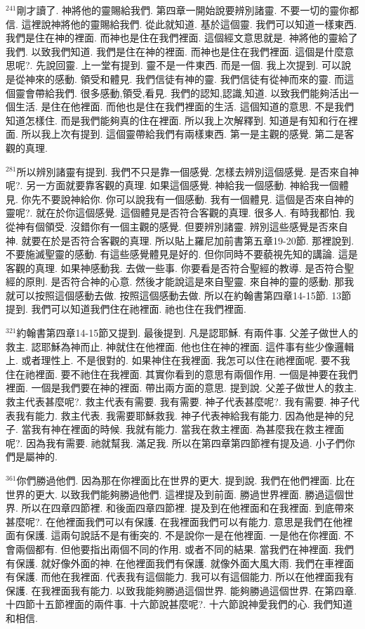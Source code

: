 \documentclass{book}
\begin{document}
$^{241}$剛才讀了.
神將他的靈賜給我們.
第四章一開始說要辨別諸靈.
不要一切的靈你都信.
這裡說神將他的靈賜給我們.
從此就知道.
基於這個靈.
我們可以知道一樣東西.
我們是住在神的裡面.
而神也是住在我們裡面.
這個經文意思就是.
神將他的靈給了我們.
以致我們知道.
我們是住在神的裡面.
而神也是住在我們裡面.
這個是什麼意思呢?.
先說回靈.
上一堂有提到.
靈不是一件東西.
而是一個.
我上次提到.
可以說是從神來的感動.
領受和體見.
我們信徒有神的靈.
我們信徒有從神而來的靈.
而這個靈會帶給我們.
很多感動,領受,看見.
我們的認知,認識,知道.
以致我們能夠活出一個生活.
是住在他裡面.
而他也是住在我們裡面的生活.
這個知道的意思.
不是我們知道怎樣住.
而是我們能夠真的住在裡面.
所以我上次解釋到.
知道是有知和行在裡面.
所以我上次有提到.
這個靈帶給我們有兩樣東西.
第一是主觀的感覺.
第二是客觀的真理.

$^{281}$所以辨別諸靈有提到.
我們不只是靠一個感覺.
怎樣去辨別這個感覺.
是否來自神呢?.
另一方面就要靠客觀的真理.
如果這個感覺.
神給我一個感動.
神給我一個體見.
你先不要說神給你.
你可以說我有一個感動.
我有一個體見.
這個是否來自神的靈呢?.
就在於你這個感覺.
這個體見是否符合客觀的真理.
很多人.
有時我都怕.
我從神有個領受.
沒錯你有一個主觀的感覺.
但要辨別諸靈.
辨別這些感覺是否來自神.
就要在於是否符合客觀的真理.
所以貼上羅尼加前書第五章19-20節.
那裡說到.
不要施滅聖靈的感動.
有這些感覺體見是好的.
但你同時不要藐視先知的講論.
這是客觀的真理.
如果神感動我.
去做一些事.
你要看是否符合聖經的教導.
是否符合聖經的原則.
是否符合神的心意.
然後才能說這是來自聖靈.
來自神的靈的感動.
那我就可以按照這個感動去做.
按照這個感動去做.
所以在約翰書第四章14-15節.
13節提到.
我們可以知道我們住在祂裡面.
祂也住在我們裡面.

$^{321}$約翰書第四章14-15節又提到.
最後提到.
凡是認耶穌.
有兩件事.
父差子做世人的救主.
認耶穌為神而止.
神就住在他裡面.
他也住在神的裡面.
這件事有些少像邏輯上.
或者理性上.
不是很對的.
如果神住在我裡面.
我怎可以住在祂裡面呢.
要不我住在祂裡面.
要不祂住在我裡面.
其實你看到的意思有兩個作用.
一個是神要在我們裡面.
一個是我們要在神的裡面.
帶出兩方面的意思.
提到說.
父差子做世人的救主.
救主代表甚麼呢?.
救主代表有需要.
我有需要.
神子代表甚麼呢?.
我有需要.
神子代表我有能力.
救主代表.
我需要耶穌救我.
神子代表神給我有能力.
因為他是神的兒子.
當我有神在裡面的時候.
我就有能力.
當我在救主裡面.
為甚麼我在救主裡面呢?.
因為我有需要.
祂就幫我.
滿足我.
所以在第四章第四節裡有提及過.
小子們你們是屬神的.

$^{361}$你們勝過他們.
因為那在你裡面比在世界的更大.
提到說.
我們在他們裡面.
比在世界的更大.
以致我們能夠勝過他們.
這裡提及到前面.
勝過世界裡面.
勝過這個世界.
所以在四章四節裡.
和後面四章四節裡.
提及到在他裡面和在我裡面.
到底帶來甚麼呢?.
在他裡面我們可以有保護.
在我裡面我們可以有能力.
意思是我們在他裡面有保護.
這兩句說話不是有衝突的.
不是說你一是在他裡面.
一是他在你裡面.
不會兩個都有.
但他要指出兩個不同的作用.
或者不同的結果.
當我們在神裡面.
我們有保護.
就好像外面的神.
在他裡面我們有保護.
就像外面大風大雨.
我們在車裡面有保護.
而他在我裡面.
代表我有這個能力.
我可以有這個能力.
所以在他裡面我有保護.
在我裡面我有能力.
以致我能夠勝過這個世界.
能夠勝過這個世界.
在第四章.
十四節十五節裡面的兩件事.
十六節說甚麼呢?.
十六節說神愛我們的心.
我們知道和相信.
\end{document}
